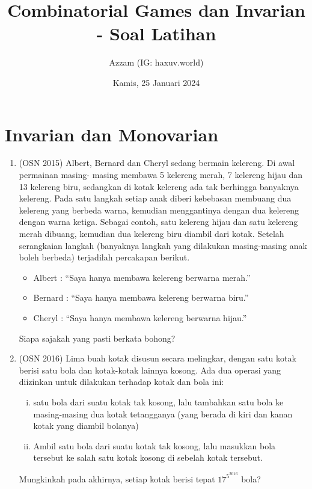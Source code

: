 \documentclass[11pt]{scrartcl}
\title{Combinatorial Games dan Invarian - Soal Latihan}
\author{Azzam (IG: haxuv.world)}
\date{Kamis, 25 Januari 2024}
\begin{document}
\maketitle
\section{Invarian dan Monovarian}
\begin{enumerate}
\item (OSN 2015) Albert, Bernard dan Cheryl sedang bermain kelereng. Di awal permainan masing- masing membawa 5 kelereng merah, 7 kelereng hijau dan 13 kelereng biru, sedangkan di kotak kelereng ada tak berhingga banyaknya kelereng. Pada satu langkah setiap anak diberi kebebasan membuang dua kelereng yang berbeda warna, kemudian menggantinya dengan dua kelereng dengan warna ketiga. Sebagai contoh, satu kelereng hijau dan satu kelereng merah dibuang, kemudian dua kelereng biru diambil dari kotak. Setelah serangkaian langkah (banyaknya langkah yang dilakukan masing-masing anak boleh berbeda) terjadilah percakapan berikut.
    \begin{itemize}
        \item Albert : “Saya hanya membawa kelereng berwarna merah.”
        \item Bernard : “Saya hanya membawa kelereng berwarna biru.”
        \item Cheryl : “Saya hanya membawa kelereng berwarna hijau.”
    \end{itemize}
    Siapa sajakah yang pasti berkata bohong?

\item (OSN 2016) Lima buah kotak disusun secara melingkar, dengan satu kotak berisi satu bola dan kotak-kotak lainnya kosong. Ada dua operasi yang diizinkan untuk dilakukan terhadap kotak dan bola ini:
    \begin{enumerate}[(i)]
        \item  satu bola dari suatu kotak tak kosong, lalu tambahkan satu bola ke masing-masing dua kotak tetangganya (yang berada di kiri dan kanan kotak yang diambil bolanya)
        \item Ambil satu bola dari suatu kotak tak kosong, lalu masukkan bola tersebut ke salah satu kotak kosong di sebelah kotak tersebut.
    \end{enumerate}
    Mungkinkah pada akhirnya, setiap kotak berisi tepat $17^{5^{2016}}$ bola?


\end{enumerate}
\end{document}
